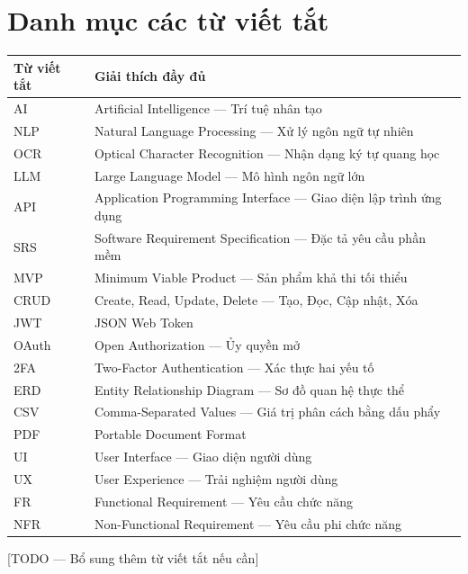 \chapter*{Danh mục các từ viết tắt}

\begin{tabularx}{\textwidth}{|l|X|}
\hline
\textbf{Từ viết tắt} & \textbf{Giải thích đầy đủ} \\ \hline
AI & Artificial Intelligence --- Trí tuệ nhân tạo \\ \hline
NLP & Natural Language Processing --- Xử lý ngôn ngữ tự nhiên \\ \hline
OCR & Optical Character Recognition --- Nhận dạng ký tự quang học \\ \hline
LLM & Large Language Model --- Mô hình ngôn ngữ lớn \\ \hline
API & Application Programming Interface --- Giao diện lập trình ứng dụng \\ \hline
SRS & Software Requirement Specification --- Đặc tả yêu cầu phần mềm \\ \hline
MVP & Minimum Viable Product --- Sản phẩm khả thi tối thiểu \\ \hline
CRUD & Create, Read, Update, Delete --- Tạo, Đọc, Cập nhật, Xóa \\ \hline
JWT & JSON Web Token \\ \hline
OAuth & Open Authorization --- Ủy quyền mở \\ \hline
2FA & Two-Factor Authentication --- Xác thực hai yếu tố \\ \hline
ERD & Entity Relationship Diagram --- Sơ đồ quan hệ thực thể \\ \hline
CSV & Comma-Separated Values --- Giá trị phân cách bằng dấu phẩy \\ \hline
PDF & Portable Document Format \\ \hline
UI & User Interface --- Giao diện người dùng \\ \hline
UX & User Experience --- Trải nghiệm người dùng \\ \hline
FR & Functional Requirement --- Yêu cầu chức năng \\ \hline
NFR & Non-Functional Requirement --- Yêu cầu phi chức năng \\ \hline
\end{tabularx}

\vspace{0.5cm}
[TODO — Bổ sung thêm từ viết tắt nếu cần]
